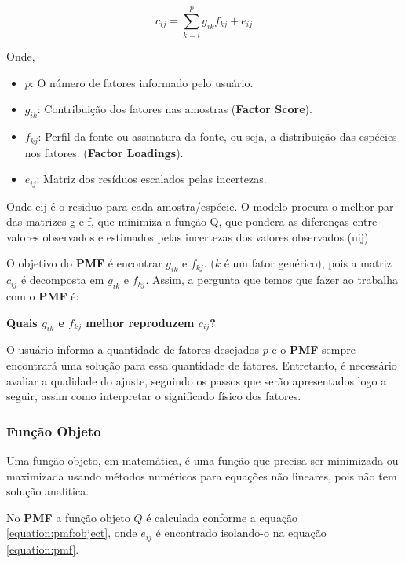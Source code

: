 \begin{equation}
  c_{ij} = \sum_{k=i}^p g_{ik}f_{kj} + e_{ij}
  \label{equation:pmf}
\end{equation}

Onde,
\begin{itemize}
  \item $p$: O número de fatores informado pelo usuário.
  \item $g_{ik}$: Contribuição dos fatores nas amostras (\textbf{Factor Score}).
  \item $f_{kj}$: Perfil da fonte ou assinatura da fonte, ou seja, 
        a distribuição das espécies nos fatores. (\textbf{Factor Loadings}).
  \item $e_{ij}$: Matriz dos resíduos escalados pelas incertezas.
\end{itemize}

Onde eij é o residuo para cada amostra/espécie.
O modelo procura o melhor par das matrizes g e f, que minimiza a função Q, que pondera as diferenças entre valores observados e estimados pelas incertezas dos valores observados (uij):

O objetivo do \textbf{PMF} é encontrar $g_{ik}$ e $f_{kj}$. 
($k$ é um fator genérico), pois a matriz $c_{ij}$ é decomposta em 
$g_{ik}$ e $f_{kj}$. Assim, a pergunta que temos que fazer ao trabalha com 
o \textbf{PMF} é: 

\textbf{Quais $g_{ik}$ e $f_{kj}$ melhor reproduzem $c_{ij}$?}

O usuário informa a quantidade de fatores desejados $p$ e o \textbf{PMF} 
sempre encontrará uma solução para essa quantidade de fatores. 
Entretanto, é necessário avaliar a qualidade do ajuste, seguindo os passos 
que serão apresentados logo a seguir, assim como interpretar o significado 
físico dos fatores. 

\subsubsection{Função Objeto}

Uma função objeto, em matemática, é uma função que precisa ser minimizada 
ou maximizada usando métodos numéricos para equações não lineares, pois não 
tem solução analítica. 

No \textbf{PMF} a função objeto $Q$ é calculada conforme a equação 
\ref{equation:pmf:object}, onde ${e_{ij}}$ é encontrado isolando-o na 
equação \ref{equation:pmf}.



